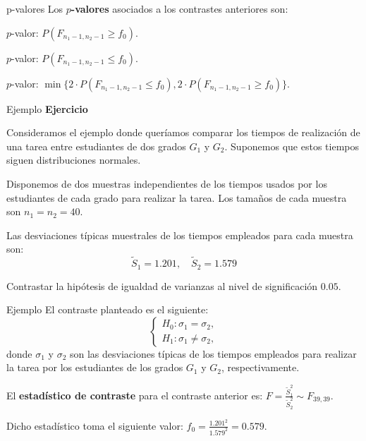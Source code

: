 \documentclass[
  ignorenonframetext,
]{beamer}
\begin{document}
\begin{frame}{p-valores}
\protect\hypertarget{p-valores}{}
Los \textbf{\(p\)-valores} asociados a los contrastes anteriores son:

\(p\)-valor: \(P(F_{n_1-1,n_2-1}\geq f_0)\).

\(p\)-valor: \(P(F_{n_1-1,n_2-1}\leq f_0)\).

\(p\)-valor:
\(\min\{2\cdot P(F_{n_1-1,n_2-1}\leq f_0),2\cdot P(F_{n_1-1,n_2-1}\geq f_0)\}\).
\end{frame}

\begin{frame}{Ejemplo}
\protect\hypertarget{ejemplo-48}{}
\textbf{Ejercicio}

Consideramos el ejemplo donde queríamos comparar los tiempos de
realización de una tarea entre estudiantes de dos grados \(G_1\) y
\(G_2\). Suponemos que estos tiempos siguen distribuciones normales.

Disponemos de dos muestras independientes de los tiempos usados por los
estudiantes de cada grado para realizar la tarea. Los tamaños de cada
muestra son \(n_1=n_2=40\).

Las desviaciones típicas muestrales de los tiempos empleados para cada
muestra son: \[
\widetilde{S}_1=1.201,\quad \widetilde{S}_2=1.579
\]

Contrastar la hipótesis de igualdad de varianzas al nivel de
significación \(0.05\).
\end{frame}

\begin{frame}{Ejemplo}
\protect\hypertarget{ejemplo-49}{}
El contraste planteado es el siguiente: \[
\left\{\begin{array}{l}
H_0:\sigma_1=\sigma_2,\\
H_1:\sigma_1\neq \sigma_2,
\end{array}\right.
\] donde \(\sigma_1\) y \(\sigma_2\) son las desviaciones típicas de los
tiempos empleados para realizar la tarea por los estudiantes de los
grados \(G_1\) y \(G_2\), respectivamente.

El \textbf{estadístico de contraste} para el contraste anterior es:
\(F=\frac{\widetilde{S}_1^2}{\widetilde{S}_2^2}\sim F_{39,39}\).

Dicho estadístico toma el siguiente valor:
\(f_0=\frac{1.201^2}{1.579^2}=0.579.\)
\end{frame}
\end{document}
